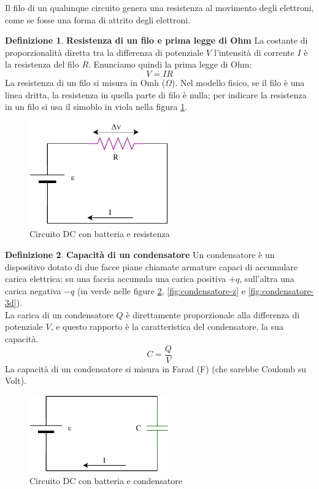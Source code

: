 \documentclass[a3paper, twoside, openany]{book}
\theoremstyle{definition}
\newtheorem{definition}{Definizione}
\begin{document}
Il filo di un qualunque circuito genera una resistenza al movimento degli elettroni, come se fosse una forma di attrito degli elettroni.
\begin{definition}{\textbf{Resistenza di un filo e prima legge di Ohm}}
La costante di proporzionalità diretta tra la differenza di potenziale $V$ l'intensità di corrente $I$ è la resistenza del filo $R$. Enunciamo quindi la prima legge di Ohm:$$V=IR$$ La resistenza di un filo si misura in Omh ($\Omega$). Nel modello fisico, se il filo è una linea dritta, la resistenza in quella parte di filo è nulla; per indicare la resistenza in un filo si usa il simoblo in viola nella figura \ref{fig:resistenza}.
\end{definition}
\begin{figure}[htp]
    \centering
    \includegraphics[width=6cm]{Circuito RC-Resistenza}
    \caption{Circuito DC con batteria e resistenza}
    \label{fig:resistenza}
\end{figure}
\begin{definition}{\textbf{Capacità di un condensatore}}
Un condensatore è un dispositivo dotato di due facce piane chiamate armature capaci di accumulare carica elettrica: su una faccia accumula una carica positiva $+q$, sull'altra una carica negativa $-q$ (in verde nelle figure \ref{fig:condensatore}, \ref{fig:condensatore-z} e \ref{fig:condensatore-3d}). \\ La carica di un condensatore $Q$ è direttamente proporzionale alla differenza di potenziale $V$, e questo rapporto è la caratteristica del condensatore, la sua capacità. $$C=\frac{Q}{V}$$ La capacità di un condensatore si misura in Farad (F) (che sarebbe Coulomb su Volt).
\end{definition}
\begin{figure}[htp]
    \centering
    \includegraphics[width=6cm]{Circuito RC-Condensatore}
    \caption{Circuito DC con batteria e condensatore}
    \label{fig:condensatore}
\end{figure}
\end{document}
